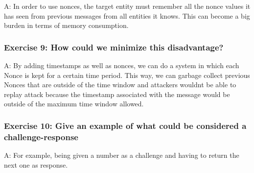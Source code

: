 \documentclass[12pt,a4paper]{article}
\begin{document}
A: In order to use nonces, the target entity must remember all the nonce values it has seen from previous messages from all entities it knows. This can become a big burden in terms of memory consumption.

\subsubsection*{Exercise 9: How could we minimize this disadvantage?}

A: By adding timestamps as well as nonces, we can do a system in which each Nonce is kept for a certain time period. This way, we can garbage collect previous Nonces that are outside of the time window and attackers wouldnt be able to replay attack because the timestamp associated with the message would be outside of the maximum time window allowed.

\subsubsection*{Exercise 10: Give an example of what could be considered a challenge-response}

A: For example, being given a number as a challenge and having to return the next one as response. 




\end{document}
